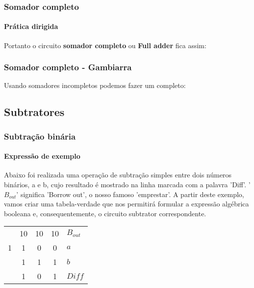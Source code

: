 \begin{frame}
	\frametitle{Somador completo}
	\framesubtitle{\textbf{Prática dirigida}}
	\par Portanto o circuito \textbf{somador completo} ou \textbf{Full adder} fica assim:
	\begin{figure}
		\centering
		
		\label{fig:somadorcompleto}
	\end{figure}
\end{frame}

\begin{frame}
	\frametitle{Somador completo - Gambiarra}
	\par Usando somadores incompletos podemos fazer um completo:
	\begin{figure}
		\centering
		
		\label{fig:somadorcompletogambiarra}
	\end{figure}
\end{frame}

\subsection{Subtratores}

\begin{frame}
	\frametitle{Subtração binária}
	\framesubtitle{Expressão de exemplo}
	\par Abaixo foi realizada uma operação de subtração simples entre dois números binários, a e b, cujo resultado é mostrado na linha marcada com a palavra 'Diff'. '$B_{out}$' significa 'Borrow out', o nosso famoso 'emprestar'. A partir deste exemplo, vamos criar uma tabela-verdade que nos permitirá formular a expressão algébrica booleana e, consequentemente, o circuito subtrator correspondente.
	\begin{table}[h!]
		\centering
		\begin{tabular}{cccc>{\centering\arraybackslash}p{2cm}}
			& 10 & 10 & 10 & $B_{out}$ \\
			1 & 1 & 0 & 0 & $a$\\
			& 1 & 1 & 1 & $b$ \\
			\hline
			& 1 & 0 & 1 & $Diff$ \\
		\end{tabular}
	\end{table}
\end{frame}

